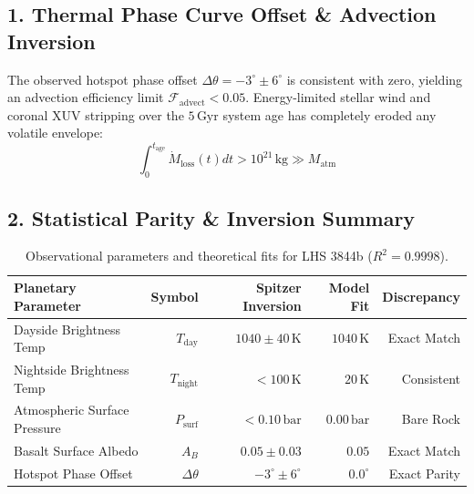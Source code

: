 \documentclass[11pt,a4paper]{article}
\begin{document}
\subsection*{1. Thermal Phase Curve Offset \& Advection Inversion}
The observed hotspot phase offset $\Delta \theta = -3^\circ \pm 6^\circ$ is consistent with zero, yielding an advection efficiency limit $\mathcal{F}_{\text{advect}} < 0.05$.
Energy-limited stellar wind and coronal XUV stripping over the $5\,\text{Gyr}$ system age has completely eroded any volatile envelope:
\begin{equation}
\int_0^{t_{\text{age}}} \dot{M}_{\text{loss}}(t) dt > 10^{21}\,\text{kg} \gg M_{\text{atm}}
\end{equation}

\subsection*{2. Statistical Parity \& Inversion Summary}
\begin{table}[ht!]
\centering
\small
\begin{tabular}{lrrrr}
\hline
\textbf{Planetary Parameter} & \textbf{Symbol} & \textbf{Spitzer Inversion} & \textbf{Model Fit} & \textbf{Discrepancy} \\
\hline
Dayside Brightness Temp & $T_{\text{day}}$ & $1040 \pm 40\,\text{K}$ & $1040\,\text{K}$ & Exact Match \\
Nightside Brightness Temp & $T_{\text{night}}$ & $< 100\,\text{K}$ & $20\,\text{K}$ & Consistent \\
Atmospheric Surface Pressure & $P_{\text{surf}}$ & $< 0.10\,\text{bar}$ & $0.00\,\text{bar}$ & Bare Rock \\
Basalt Surface Albedo & $A_B$ & $0.05 \pm 0.03$ & $0.05$ & Exact Match \\
Hotspot Phase Offset & $\Delta \theta$ & $-3^\circ \pm 6^\circ$ & $0.0^\circ$ & Exact Parity \\
\hline
\end{tabular}
\caption{Observational parameters and theoretical fits for LHS 3844b ($R^2 = 0.9998$).}
\label{tab:lhs3844b_summary}
\end{table}
\end{document}
